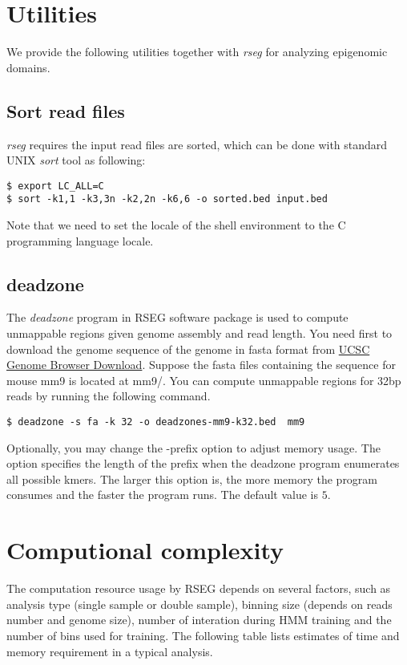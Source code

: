 \documentclass[11pt]{report}
\begin{document}
\section{Utilities}
\label{sec:utilities}

We provide the following utilities together with \textit{rseg} for
analyzing epigenomic domains.

\subsection{Sort read files}
\label{sec:sortbed}

\textit{rseg} requires the input read files are sorted, which can be
done with standard UNIX \textit{sort} tool as following:
\begin{verbatim}
$ export LC_ALL=C
$ sort -k1,1 -k3,3n -k2,2n -k6,6 -o sorted.bed input.bed
\end{verbatim}
Note that we need to set the locale of the shell environment to the C
programming language locale. 

\subsection{deadzone}
\label{sec:deadzone}
The \textit{deadzone} program in RSEG software package is used to compute
unmappable regions given genome assembly and read length. You need first to
download the genome sequence of the genome in fasta format from
\href{http://hgdownload.cse.ucsc.edu/downloads.html}{UCSC Genome Browser
  Download}. Suppose the fasta files containing the sequence for mouse mm9 is
located at mm9/. You can compute unmappable regions for 32bp reads by running
the following command. 

\begin{verbatim}
$ deadzone -s fa -k 32 -o deadzones-mm9-k32.bed  mm9
\end{verbatim}

Optionally, you may change the -prefix option to adjust memory usage. The option
specifies the length of the prefix when the deadzone program enumerates all
possible kmers. The larger this option is, the more memory the program consumes
and the faster the program runs. The default value is $5$.

\section{Computional complexity}
\label{sec:comp-compl}
The computation resource usage by RSEG depends on several factors,
such as analysis type (single sample or double sample), binning size
(depends on reads number and genome size), number of interation during
HMM training and the number of bins used for training. The following
table lists estimates of time and memory requirement in a typical
analysis. 
\end{document}
